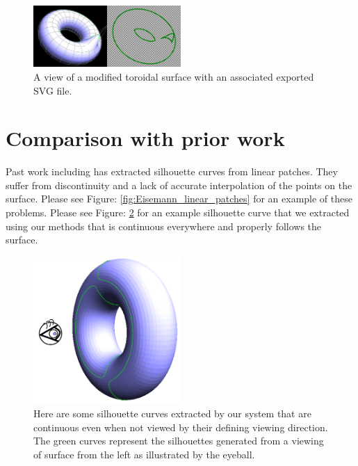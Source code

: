 \documentclass[12pt, letterpaper]{article}
\begin{document}
\begin{figure}[h]
\centering
\includegraphics[width=0.5\textwidth]{SVG_Exportation}
\caption{A view of a modified toroidal surface with an associated exported SVG file.}
\label{fig:svg_export}
\end{figure}


\section{Comparison with prior work}

Past work including \cite{Eisemann08} has extracted silhouette curves from linear patches. They suffer from discontinuity and a lack of accurate interpolation of the points on the surface.
Please see Figure: \ref{fig:Eisemann_linear_patches} for an example of these problems. Please see Figure: \ref{fig:torus_silhouette_side_view} for an example silhouette curve that we extracted using our methods that is continuous everywhere and properly follows the surface.


\begin{figure}[h]
\centering
\includegraphics[width=0.5\textwidth]{torus_silhouettes_side_view}
\caption{Here are some silhouette curves extracted by our system that are continuous even when not viewed by their defining viewing direction.
		The green curves represent the silhouettes generated from a viewing of surface from the left as illustrated by the eyeball.}
\label{fig:torus_silhouette_side_view}
\end{figure}

\newpage
\end{document}
